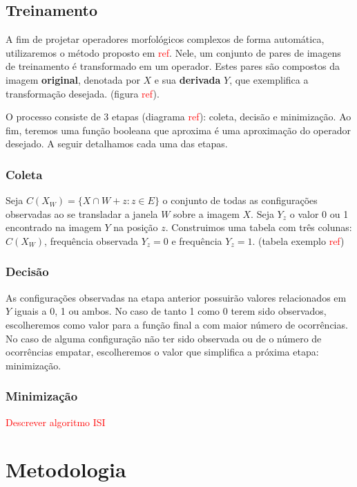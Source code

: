 \documentclass[a4paper,11pt]{article}
\newcommand{\TODO}[1]{\textcolor{red}{#1}}
\begin{document}
\subsection{Treinamento}

A fim de projetar operadores morfológicos complexos de forma automática, utilizaremos o método proposto em \TODO{ref}. Nele, um conjunto de pares de imagens de treinamento é transformado em um operador. Estes pares são compostos da imagem \textbf{original}, denotada por $X$ e sua \textbf{derivada} $Y$, que exemplifica a transformação desejada. (figura \TODO{ref}).

O processo consiste de 3 etapas (diagrama \TODO{ref}): coleta, decisão e minimização. Ao fim, teremos uma função booleana que aproxima é uma aproximação do operador desejado. A seguir detalhamos cada uma das etapas.

\subsubsection{Coleta}

Seja $C(X_W) = \{X \cap W + z \colon z \in E \}$ o conjunto de todas as configurações observadas ao se transladar a janela $W$ sobre a imagem $X$. Seja $Y_z$ o valor 0 ou 1 encontrado na imagem $Y$ na posição $z$. Construimos uma tabela com três colunas: $C(X_W)$, frequência observada $Y_z = 0$ e frequência $Y_z = 1$. (tabela exemplo \TODO{ref})

\subsubsection{Decisão}

As configurações observadas na etapa anterior possuirão valores relacionados em $Y$ iguais a 0, 1 ou ambos. No caso de tanto 1 como 0 terem sido observados, escolheremos como valor para a função final a com maior número de ocorrências. No caso de alguma configuração não ter sido observada ou de o número de ocorrências empatar, escolheremos o valor que simplifica a próxima etapa: minimização.

\subsubsection{Minimização}

\TODO{Descrever algoritmo ISI}

\section{Metodologia}
\end{document}
